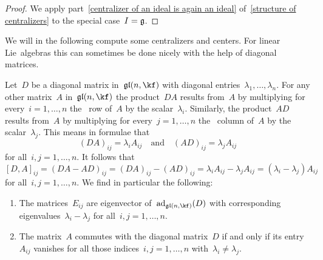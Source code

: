 \begin{proof}
	We apply part~\ref{centralizer of an ideal is again an ideal} of~\cref{structure of centralizers} to the special case~$I = \mathfrak{g}$.
\end{proof}


\begin{fluff}
	We will in the following compute some centralizers and centers.
	For linear Lie~algebras this can sometimes be done nicely with the help of diagonal matrices.
\end{fluff}


\begin{recall}
	\label{background on diagonal matrices}
	Let~$D$ be a diagonal matrix in~$\gllie(n, \kf)$ with diagonal entries~$\lambda_1, \dotsc, \lambda_n$.
	For any other matrix~$A$ in~$\gllie(n, \kf)$ the product~$DA$ results from~$A$ by multiplying for every~$i = 1, \dotsc, n$ the~ row of~$A$ by the scalar~$\lambda_i$.
	Similarly, the product~$AD$ results from~$A$ by multiplying for every~$j = 1, \dotsc, n$ the~ column of~$A$ by the scalar~$\lambda_j$.
	This means in formulae that
	\[
		(DA)_{ij}
		=
		\lambda_i A_{ij}
		\quad\text{and}\quad
		(AD)_{ij}
		=
		\lambda_j A_{ij}
	\]
	for all~$i, j = 1, \dotsc, n$.
	It follows that
	\[
		[D, A]_{ij}
		=
		(DA - AD)_{ij}
		=
		(DA)_{ij} - (AD)_{ij}
		=
		\lambda_i A_{ij} - \lambda_j A_{ij}
		=
		(\lambda_i - \lambda_j) A_{ij}
	\]
	for all~$i, j = 1, \dotsc, n$.
	We find in particular the following:
	\begin{enumerate}
		\item
			The matrices~$E_{ij}$ are eigenvector of~$\ad_{\gllie(n, \kf)}(D)$ with corresponding eigenvalues~$\lambda_i - \lambda_j$ for all~$i, j = 1, \dotsc, n$.
		\item
			The matrix~$A$ commutes with the diagonal matrix~$D$ if and only if its entry~$A_{ij}$ vanishes for all those indices~$i, j = 1, \dotsc, n$ with~$\lambda_i \neq \lambda_j$.


\end{enumerate}
\end{recall}
